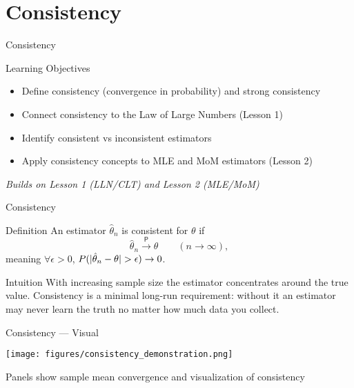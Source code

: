
\section{Consistency}

\begin{frame}{Consistency}
  \begin{block}{Learning Objectives}
    \begin{itemize}
      \item Define consistency (convergence in probability) and strong consistency
      \item Connect consistency to the Law of Large Numbers (Lesson 1)
      \item Identify consistent vs inconsistent estimators
      \item Apply consistency concepts to MLE and MoM estimators (Lesson 2)
    \end{itemize}
  \end{block}

  \vspace{1em}
  \begin{center}
    \textit{Builds on Lesson 1 (LLN/CLT) and Lesson 2 (MLE/MoM)}
  \end{center}
\end{frame}

\begin{frame}{Consistency}
  \begin{block}{Definition}
    An estimator $\hat{\theta}_n$ is consistent for $\theta$ if
    \[\hat{\theta}_n \xrightarrow{\;\mathsf{P}\;} \theta \qquad (n \to \infty),\]
    meaning $\forall \epsilon > 0$, $\P(|\hat{\theta}_n - \theta| > \epsilon) \to 0$.
  \end{block}

  \begin{block}{Intuition}
    With increasing sample size the estimator concentrates around the true
    value. Consistency is a minimal long-run requirement: without it an
    estimator may never learn the truth no matter how much data you collect.
  \end{block}
\end{frame}

\begin{frame}{Consistency --- Visual}
  \begin{center}
    \texttt{[image: figures/consistency\_demonstration.png]}
  \end{center}
  \vspace{-0.3cm}
  \footnotesize Panels show sample mean convergence and visualization of consistency
\end{frame}

